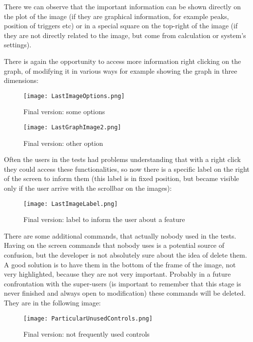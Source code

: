 There we can observe that the important information can be shown directly on the plot of the image (if they are graphical information, for example peaks, position of triggers etc) or in a special square on the top-right of the image (if they are not directly related to the image, but come from calculation or system's settings).

\newpage

There is again the opportunity to access more information right clicking on the graph, of modifying it in various ways for example showing the graph in three dimensions: 

\begin{figure}[H]
\centering
\texttt{[image: LastImageOptions.png]} 
\caption{Final version: some options}
\end{figure}  

\begin{figure}[H]
\centering
\texttt{[image: LastGraphImage2.png]} 
\caption{Final version: other option}
\end{figure}  

Often the users in the tests had problems understanding that with a right click they could access these functionalities, so now there is a specific label on the right of the screen to inform them (this label is in fixed position, but became visible only if the user arrive with the scrollbar on the images):

\begin{figure}[H]
\centering
\texttt{[image: LastImageLabel.png]} 
\caption{Final version: label to inform the user about a feature}
\end{figure} 

There are some additional commands, that actually nobody used in the tests. Having on the screen commands that nobody uses is a potential source of confusion, but the developer is not absolutely sure about the idea of delete them. A good solution is to have them in the bottom of the frame of the image, not very highlighted, because they are not very important. Probably in a future confrontation with the super-users (is important to remember that this stage is never finished and always open to modification) these commands will be deleted.
They are in the following image:

\begin{figure}[H]
\centering
\texttt{[image: ParticularUnusedControls.png]} 
\caption{Final version: not frequently used controls}
\end{figure}  
